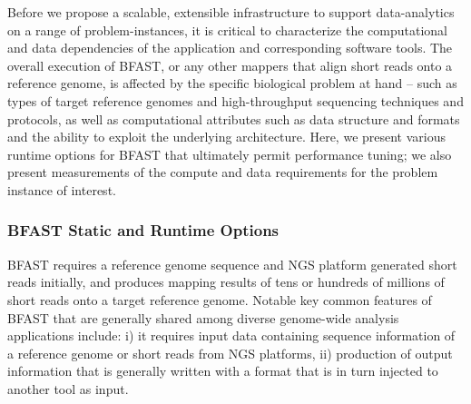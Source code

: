 \documentclass{cpeauth}
\begin{document}
Before we propose a scalable, extensible infrastructure to support
data-analytics on a range of problem-instances, it is critical to
characterize the computational and data dependencies of the
application and corresponding software tools.  %
The overall execution of BFAST, or any other mappers that align short
reads onto a reference genome, is affected by the specific biological
problem at hand -- such as types of target reference genomes and
high-throughput sequencing techniques and protocols, as well as
computational attributes such as data structure and formats and the
ability to exploit the underlying architecture.  Here, we present
various runtime options for BFAST that ultimately permit performance
tuning; we also present measurements of the compute and data
requirements for the problem instance of interest.


\subsubsection{BFAST Static and Runtime Options}

BFAST requires a reference genome sequence and NGS platform generated
short reads initially, and produces mapping results of tens or
hundreds of millions of short reads onto a target reference genome.
Notable key common features of BFAST that are generally shared among
diverse genome-wide analysis applications include: i) it requires
input data containing sequence information of a reference genome or
short reads from NGS platforms, ii) production of output information
that is generally written with a format that is in turn injected to
another tool as input.

 
\end{document}
